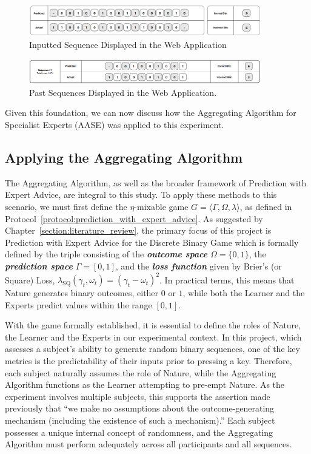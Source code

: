 \begin{figure}[ht]
    \centering
    \includegraphics[width=0.9\textwidth]{images/sequence_input.png}
    \caption{Inputted Sequence Displayed in the Web Application}
\end{figure}

\begin{figure}[ht]
    \centering
    \includegraphics[width=0.9\textwidth]{images/past_sequences.png}
    \caption{Past Sequences Displayed in the Web Application.}
\end{figure}

Given this foundation, we can now discuss how the Aggregating Algorithm for Specialist Experts (AASE) was applied to this experiment.

\subsection{Applying the Aggregating Algorithm}\label{subsection:applying_the_aggregating_algorithm}
The Aggregating Algorithm, as well as the broader framework of Prediction with Expert Advice, are integral to this study. To apply these methods to this scenario, we must first define the $\eta$-mixable game $G = \langle \Gamma, \Omega, \lambda \rangle$, as defined in Protocol~\ref{protocol:prediction_with_expert_advice}. As suggested by Chapter~\ref{section:literature_review}, the primary focus of this project is Prediction with Expert Advice for the Discrete Binary Game which is formally defined by the triple consisting of the \textbf{\textit{outcome space}} $\Omega = \{0, 1\}$, the \textbf{\textit{prediction space}} $\Gamma = [0, 1]$, and the \textbf{\textit{loss function}} given by Brier's (or Square) Loss, $\lambda_\text{SQ}(\gamma_t, \omega_t) = {(\gamma_t - \omega_t)}^2$. In practical terms, this means that Nature generates binary outcomes, either $0$ or $1$, while both the Learner and the Experts predict values within the range $[0, 1]$.

With the game formally established, it is essential to define the roles of Nature, the Learner and the Experts in our experimental context. In this project, which assesses a subject's ability to generate random binary sequences, one of the key metrics is the predictability of their inputs prior to pressing a key. Therefore, each subject naturally assumes the role of Nature, while the Aggregating Algorithm functions as the Learner attempting to pre-empt Nature. As the experiment involves multiple subjects, this supports the assertion made previously that ``we make no assumptions about the outcome-generating mechanism (including the existence of such a mechanism).'' Each subject possesses a unique internal concept of randomness, and the Aggregating Algorithm must perform adequately across all participants and all sequences.

